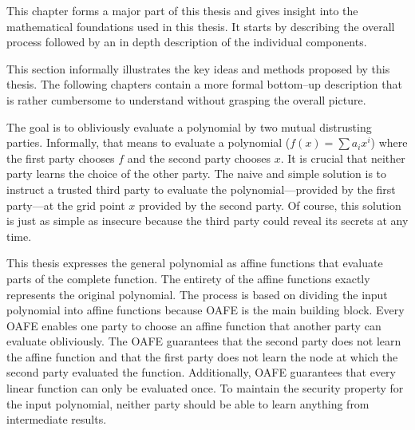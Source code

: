 \label{sec:methods}

This chapter forms a major part of this thesis and gives insight into the
mathematical foundations used in this thesis. It starts by describing the
overall process followed by an in depth description of the individual
components.


%
%
\label{sec:illustration}

This section informally illustrates the key ideas and methods proposed by this
thesis. The following chapters contain a more formal bottom--up description that
is rather cumbersome to understand without grasping the overall picture.

The goal is to obliviously evaluate a polynomial by two mutual distrusting
parties. Informally, that means to evaluate a polynomial ($f(x) = \sum a_ix^i$)
where the first party chooses $f$ and the second party chooses $x$. It is
crucial that neither party learns the choice of the other party. The naive and
simple solution is to instruct a trusted third party to evaluate the
polynomial---provided by the first party---at the grid point $x$ provided by the
second party. Of course, this solution is just as simple as insecure because the
third party could reveal its secrets at any time.

This thesis expresses the general polynomial as affine functions that evaluate
parts of the complete function. The entirety of the affine functions exactly
represents the original polynomial. The process is based on dividing the input
polynomial into affine functions because  {OAFE} \cite{davidgoliath} is the main building block.
Every OAFE enables one party to choose an affine function that another party can
evaluate obliviously. The OAFE guarantees that the second party does not learn
the affine function and that the first party does not learn the node at which
the second party evaluated the function. Additionally, OAFE guarantees that
every linear function can only be evaluated once. To maintain the security
property for the input polynomial, neither party should be able to learn
anything from intermediate results.

